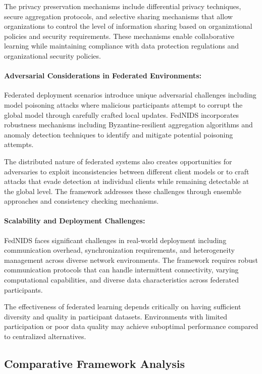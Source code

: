 The privacy preservation mechanisms include differential privacy techniques, secure aggregation protocols, and selective sharing mechanisms that allow organizations to control the level of information sharing based on organizational policies and security requirements. These mechanisms enable collaborative learning while maintaining compliance with data protection regulations and organizational security policies.

\paragraph{Adversarial Considerations in Federated Environments:}
Federated deployment scenarios introduce unique adversarial challenges including model poisoning attacks where malicious participants attempt to corrupt the global model through carefully crafted local updates. FedNIDS incorporates robustness mechanisms including Byzantine-resilient aggregation algorithms and anomaly detection techniques to identify and mitigate potential poisoning attempts.

The distributed nature of federated systems also creates opportunities for adversaries to exploit inconsistencies between different client models or to craft attacks that evade detection at individual clients while remaining detectable at the global level. The framework addresses these challenges through ensemble approaches and consistency checking mechanisms.

\paragraph{Scalability and Deployment Challenges:}
FedNIDS faces significant challenges in real-world deployment including communication overhead, synchronization requirements, and heterogeneity management across diverse network environments. The framework requires robust communication protocols that can handle intermittent connectivity, varying computational capabilities, and diverse data characteristics across federated participants.

The effectiveness of federated learning depends critically on having sufficient diversity and quality in participant datasets. Environments with limited participation or poor data quality may achieve suboptimal performance compared to centralized alternatives.

\subsection{Comparative Framework Analysis}


